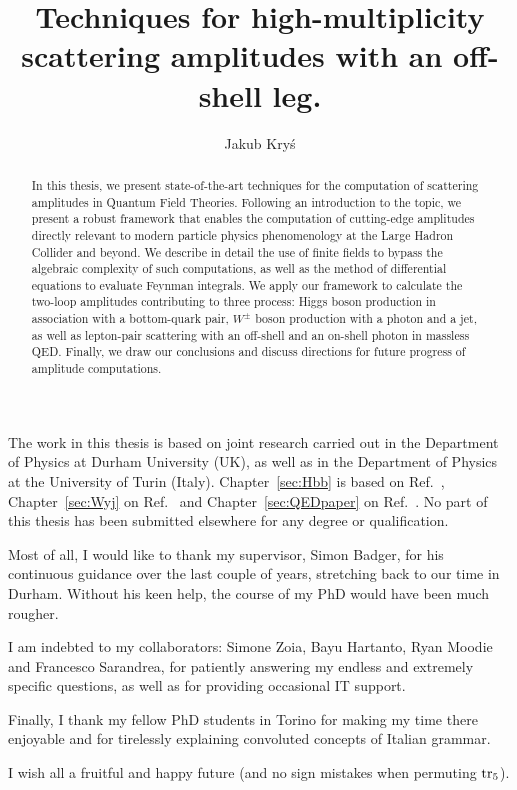 \documentclass[twoside,frontopenright,halfspacing, openany]{ip3thesis}
\begin{document}
\title{Techniques for high-multiplicity scattering amplitudes with an off-shell leg.}
\author{Jakub Kry\'s}
\maketitlepage*

\begin{abstract}
%
	In this thesis, we present state-of-the-art techniques for the computation of scattering amplitudes in Quantum Field Theories. Following an introduction to the topic, we present a robust framework that enables the computation of cutting-edge amplitudes directly relevant to modern particle physics phenomenology at the Large Hadron Collider and beyond. We describe in detail the use of finite fields to bypass the algebraic complexity of such computations, as well as the method of differential equations to evaluate Feynman integrals. We apply our framework to calculate the two-loop amplitudes contributing to three process: Higgs boson production in association with a bottom-quark pair, $W^\pm$ boson production with a photon and a jet, as well as lepton-pair scattering with an off-shell and an on-shell photon in massless QED. Finally, we draw our conclusions and discuss directions for future progress of amplitude computations.
%
\end{abstract}

\disableprotrusion
\tableofcontents*
\enableprotrusion

\begin{declaration*}
%
	The work in this thesis is based on joint research carried out in the Department of
	Physics at Durham University (UK), as well as in the Department of Physics at the University of Turin (Italy). Chapter~\ref{sec:Hbb} is based on Ref.~\cite{Badger:2021ega}, Chapter~\ref{sec:Wyj} on Ref.~\cite{Badger:2022ncb} and Chapter~\ref{sec:QEDpaper} on Ref.~\cite{Badger:2023xtl}. No part of this thesis has been submitted elsewhere for any degree or qualification.  
%
\end{declaration*}

\begin{acknowledgements*}
%
	Most of all, I would like to thank my supervisor, Simon Badger, for his continuous guidance over the last couple of years, stretching back to our time in Durham. Without his keen help, the course of my PhD would have been much rougher.
 
    I am indebted to my collaborators: Simone Zoia, Bayu Hartanto, Ryan Moodie and Francesco Sarandrea, for patiently answering my endless and extremely specific questions, as well as for providing occasional IT support.
    
    Finally, I thank my fellow PhD students in Torino for making my time there enjoyable and for tirelessly explaining convoluted concepts of Italian grammar.
    
    I wish all a fruitful and happy future (and no sign mistakes when permuting $\operatorname{\rm tr}_5$).
%
\end{acknowledgements*}
\end{document}
